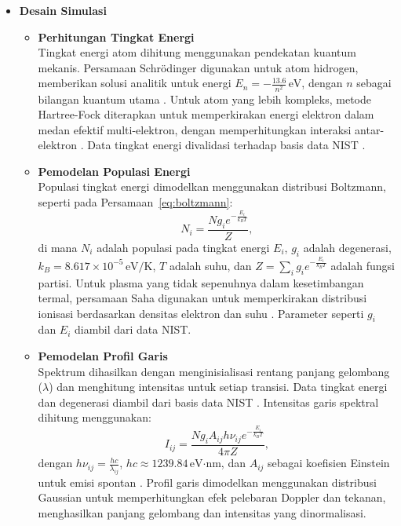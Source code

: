 \begin{itemize}
    \item \textbf{Desain Simulasi}
        \begin{itemize}
            \item \textbf{Perhitungan Tingkat Energi} \\
                  Tingkat energi atom dihitung menggunakan pendekatan kuantum mekanis. Persamaan Schrödinger digunakan untuk atom hidrogen, memberikan solusi analitik untuk energi \( E_n = -\frac{13.6}{n^2} \, \text{eV} \), dengan \( n \) sebagai bilangan kuantum utama \citep{Griffiths2005}. Untuk atom yang lebih kompleks, metode Hartree-Fock diterapkan untuk memperkirakan energi elektron dalam medan efektif multi-elektron, dengan memperhitungkan interaksi antar-elektron \citep{Szabo1996}. Data tingkat energi divalidasi terhadap basis data NIST \citep{NIST2025}.

            \item \textbf{Pemodelan Populasi Energi} \\
                  Populasi tingkat energi dimodelkan menggunakan distribusi Boltzmann, seperti pada Persamaan~\eqref{eq:boltzmann}:
                  \begin{equation}
                      N_i = \frac{N g_i e^{-\frac{E_i}{k_B T}}}{Z}, \label{eq:boltzmann}
                  \end{equation}
                  di mana \( N_i \) adalah populasi pada tingkat energi \( E_i \), \( g_i \) adalah degenerasi, \( k_B = 8.617 \times 10^{-5} \, \text{eV/K} \), \( T \) adalah suhu, dan \( Z = \sum_i g_i e^{-\frac{E_i}{k_B T}} \) adalah fungsi partisi. Untuk plasma yang tidak sepenuhnya dalam kesetimbangan termal, persamaan Saha digunakan untuk memperkirakan distribusi ionisasi berdasarkan densitas elektron dan suhu \citep{Draine2011}. Parameter seperti \( g_i \) dan \( E_i \) diambil dari data NIST.

            \item \textbf{Pemodelan Profil Garis} \\
                  Spektrum dihasilkan dengan menginisialisasi rentang panjang gelombang (\( \lambda \)) dan menghitung intensitas untuk setiap transisi. Data tingkat energi dan degenerasi diambil dari basis data NIST \citep{NIST2025}. Intensitas garis spektral dihitung menggunakan:
                  \begin{equation}
                      I_{ij} = \frac{N g_i A_{ij} h \nu_{ij} e^{-\frac{E_i}{k_B T}}}{4\pi Z}, \label{eq:intensity_full}
                  \end{equation}
                  dengan \( h \nu_{ij} = \frac{h c}{\lambda_{ij}} \), \( h c \approx 1239.84 \, \text{eV·nm} \), dan \( A_{ij} \) sebagai koefisien Einstein untuk emisi spontan \citep{rybicki-1985}. Profil garis dimodelkan menggunakan distribusi Gaussian untuk memperhitungkan efek pelebaran Doppler dan tekanan, menghasilkan panjang gelombang dan intensitas yang dinormalisasi.


\end{itemize}
\end{itemize}
